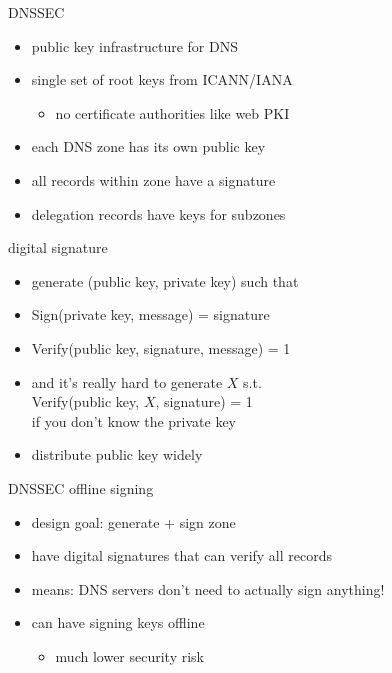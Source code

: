 \begin{frame}{DNSSEC}
    \begin{itemize}
    \item public key infrastructure for DNS
    \item single set of root keys from ICANN/IANA
        \begin{itemize}
        \item no certificate authorities like web PKI
        \end{itemize}
    \item each DNS zone has its own public key
    \item all records within zone have a signature
    \item delegation records have keys for subzones
    \end{itemize}
\end{frame}

\begin{frame}{digital signature}
    \begin{itemize}
    \item generate (public key, private key) such that
    \item Sign(private key, message) = signature
    \item Verify(public key, signature, message) = 1
    \item and it's really hard to generate $X$ s.t. \\
        Verify(public key, $X$, signature) = 1 \\
        if you don't know the private key
    \vspace{.5cm}
    \item distribute public key widely
    \end{itemize}
\end{frame}

\begin{frame}{DNSSEC offline signing}
    \begin{itemize}
    \item design goal: generate + sign zone
    \item have digital signatures that can verify all records
    \vspace{.5cm}
    \item means: DNS servers don't need to actually sign anything!
    \item can have signing keys offline
        \begin{itemize}
        \item much lower security risk
        \end{itemize}
    \end{itemize}
\end{frame}


